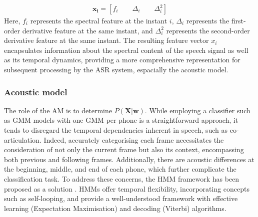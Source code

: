 \begin{align}
    \boldsymbol{x_i} = [f_i \qquad \Delta_i \qquad \Delta^{2}_i]
\end{align}
Here, $f_i$ represents the spectral feature at the instant $i$, $\Delta_i$ represents the first-order derivative feature at the same instant, and $\Delta^2_i$ represents the second-order derivative feature at the same instant. The resulting feature vector $x_i$ encapsulates information about the spectral content of the speech signal as well as its temporal dynamics, providing a more comprehensive representation for subsequent processing by the \ac{ASR} system, espacially the acoustic model.


\subsubsection{Acoustic model}%
The role of the \ac{AM} is to determine $P(\boldsymbol{X}|\boldsymbol{w})$. While employing a classifier such as \ac{GMM} models with one \ac{GMM} per phone is a straightforward approach, it tends to disregard the temporal dependencies inherent in speech, such as co-articulation. Indeed, accurately categorising each frame necessitates the consideration of not only the current frame but also its context, encompassing both previous and following frames. Additionally, there are acoustic differences at the beginning, middle, and end of each phone, which further complicate the classification task. To address these concerns, the \ac{HMM} framework has been proposed as a solution \cite{Dragon_system}. \acp{HMM} offer temporal flexibility, incorporating concepts such as self-looping, and provide a well-understood framework with effective learning (Expectation Maximisation) and decoding (Viterbi) algorithms. 



